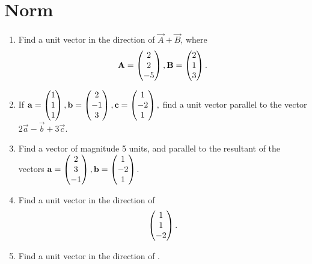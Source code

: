 \documentclass[journal,12pt,twocolumn]{IEEEtran}
\renewcommand\thesection{\arabic{section}}
\begin{document}
\section{Norm }
\renewcommand{\theequation}{\theenumi}
\begin{enumerate}[label=\thesection.\arabic*.,ref=\thesection.\theenumi]

\item Find a unit vector in the direction of $\vec{A}+\vec{B}$, where 
%
\begin{align}
\mathbf{A} = \begin{pmatrix}2\\2\\-5\end{pmatrix}, \mathbf{B} = \begin{pmatrix}2\\1\\3\end{pmatrix}.
\end{align}
%
\solution

%
\item  If 
$
\mathbf{a}=\begin{pmatrix}1\\1\\1\end{pmatrix},
\mathbf{b}=\begin{pmatrix}2\\-1\\3\end{pmatrix},
\mathbf{c}=\begin{pmatrix}1\\-2\\1\end{pmatrix},
$
find a unit vector parallel to the vector $2\vec{a}-\vec{b}+3\vec{c}$.
\\
\solution 


\item Find a vector of magnitude 5 units, and parallel to the resultant of the vectors 
$
\mathbf{a}=\begin{pmatrix}2\\3\\-1\end{pmatrix},
\mathbf{b}=\begin{pmatrix}1\\-2\\1\end{pmatrix}
$.
\\
\solution 

\item Find a unit vector in the direction of 
%
\begin{align}
\begin{pmatrix}1\\1\\-2\end{pmatrix}.
\end{align}
%
\solution
%

%
\item Find a unit vector in the direction of .
\\
\solution
%


\end{enumerate}
\end{document}
